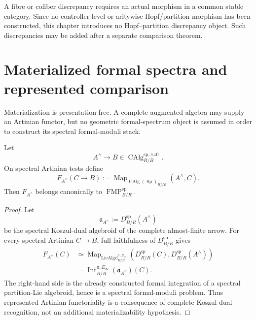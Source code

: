 \begin{remark}
A fibre or cofiber discrepancy requires an actual morphism in a common stable
category.  Since no controller-level or aritywise Hopf/partition morphism has
been constructed, this chapter introduces no Hopf--partition discrepancy
object.  Such discrepancies may be added after a separate comparison theorem.
\end{remark}

\section{Materialized formal spectra and represented comparison}
\label{sec:bnli-represented-materialization}

Materialization is presentation-free.  A complete augmented algebra may
supply an Artinian functor, but no geometric formal-spectrum object is assumed
in order to construct its spectral formal-moduli stack.

\begin{proposition}
\label{prop:bnli-complete-arrow-fmp}
Let
\[
    A^\wedge\longrightarrow B
    \in
    \operatorname{CAlg}^{\mathrm{sp},\wedge\mathrm{aft}}_{R/B}.
\]
On spectral Artinian tests define
\[
\boxed{
    F_{A^\wedge}(C\to B)
    :=
    \operatorname{Map}_{\operatorname{CAlg}(\operatorname{Sp})_{R//B}}
    (A^\wedge,C).}
\]
Then $F_{A^\wedge}$ belongs canonically to
$\operatorname{FMP}^{\mathrm{sp}}_{B/R}$.
\end{proposition}

\begin{proof}
Let
\[
    \mathfrak a_{A^\wedge}
    :=
    D^{\mathrm{sp}}_{B/R}(A^\wedge)
\]
be the spectral Koszul-dual algebroid of the complete almost-finite arrow.
For every spectral Artinian $C\to B$, full faithfulness of
$D^{\mathrm{sp}}_{B/R}$ gives
\[
\begin{aligned}
    F_{A^\wedge}(C)
    &\simeq
    \operatorname{Map}_{\operatorname{LieAlgd}^{\pi,E_\infty}_{B/R}}
    \left(
      D^{\mathrm{sp}}_{B/R}(C),
      D^{\mathrm{sp}}_{B/R}(A^\wedge)
    \right)\\
    &=
    \operatorname{Int}^{\pi,E_\infty}_{B/R}
    (\mathfrak a_{A^\wedge})(C).
\end{aligned}
\]
The right-hand side is the already constructed formal integration of a
spectral partition-Lie algebroid, hence is a spectral formal-moduli problem.
Thus represented Artinian functoriality is a consequence of complete
Koszul-dual recognition, not an additional materializability hypothesis.
\end{proof}

